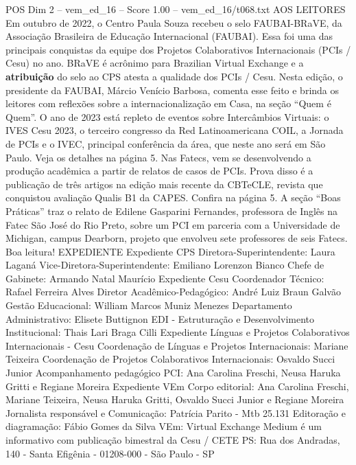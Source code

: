 \begin{textsample}{POS Dim 2 – vem\_ed\_16 – Score 1.00 – vem\_ed\_16/t068.txt}  \label{ex:f2_pos_018}
AOS LEITORES Em outubro de 2022, o Centro Paula Souza recebeu o selo FAUBAI-BRaVE, da Associação Brasileira de Educação Internacional (FAUBAI).
Essa foi uma das principais conquistas da equipe dos Projetos Colaborativos Internacionais (PCIs / Cesu) no ano.
BRaVE é acrônimo para Brazilian Virtual Exchange e a \textbf{atribuição} do selo ao CPS atesta a qualidade dos PCIs / Cesu.
Nesta edição, o presidente da FAUBAI, Márcio Venício Barbosa, comenta esse feito e brinda os leitores com reflexões sobre a internacionalização em Casa, na seção “Quem é Quem”.
O ano de 2023 está repleto de eventos sobre Intercâmbios Virtuais: o IVES Cesu 2023, o terceiro congresso da Red Latinoamericana COIL, a Jornada de PCIs e o IVEC, principal conferência da área, que neste ano será em São Paulo.
Veja os detalhes na página 5.
Nas Fatecs, vem se desenvolvendo a produção acadêmica a partir de relatos de casos de PCIs.
Prova disso é a publicação de três artigos na edição mais recente da CBTeCLE, revista que conquistou avaliação Qualis B1 da CAPES.
Confira na página 5.
A seção “Boas Práticas” traz o relato de Edilene Gasparini Fernandes, professora de Inglês na Fatec São José do Rio Preto, sobre um PCI em parceria com a Universidade de Michigan, campus Dearborn, projeto que envolveu sete professores de seis Fatecs.
Boa leitura!
EXPEDIENTE Expediente CPS Diretora-Superintendente: Laura Laganá Vice-Diretora-Superintendente: Emiliano Lorenzon Bianco Chefe de Gabinete: Armando Natal Maurício Expediente Cesu Coordenador Técnico: Rafael Ferreira Alves Diretor Acadêmico-Pedagógico: André Luiz Braun Galvão Gestão Educacional: William Marcos Muniz Menezes Departamento Administrativo: Elisete Buttignon EDI - Estruturação e Desenvolvimento Institucional: Thais Lari Braga Cilli Expediente Línguas e Projetos Colaborativos Internacionais - Cesu Coordenação de Línguas e Projetos Internacionais: Mariane Teixeira Coordenação de Projetos Colaborativos Internacionais: Osvaldo Succi Junior Acompanhamento pedagógico PCI: Ana Carolina Freschi, Neusa Haruka Gritti e Regiane Moreira Expediente VEm Corpo editorial: Ana Carolina Freschi, Mariane Teixeira, Neusa Haruka Gritti, Osvaldo Succi Junior e Regiane Moreira Jornalista responsável e Comunicação: Patrícia Parito - Mtb 25.131 Editoração e diagramação: Fábio Gomes da Silva VEm: Virtual Exchange Medium é um informativo com publicação bimestral da Cesu / CETE PS: Rua dos Andradas, 140 - Santa Efigênia - 01208-000 - São Paulo - SP

\end{textsample}
